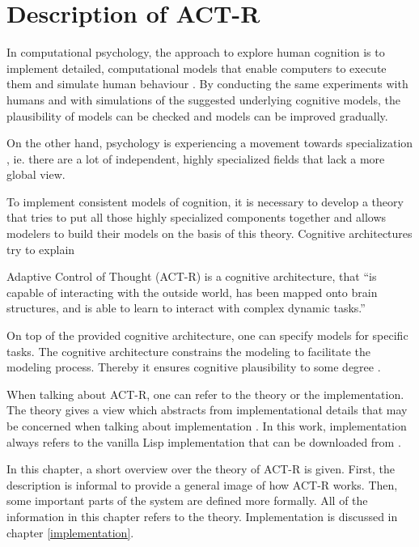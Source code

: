 \chapter{Description of ACT-R}

In computational psychology, the approach to explore human cognition is to implement detailed, computational models that enable computers to execute them and simulate human behaviour \cite{sun_introduction_2008}. By conducting the same experiments with humans and with simulations of the suggested underlying cognitive models, the plausibility of models can be checked and models can be improved gradually.

On the other hand, psychology is experiencing a movement towards specialization \cite{anderson_integrated_2004}, ie. there are a lot of independent, highly specialized fields that lack a more global view.

To implement consistent models of cognition, it is necessary to develop a theory that tries to put all those highly specialized components together and allows modelers to build their models on the basis of this theory. Cognitive architectures try to explain 


Adaptive Control of Thought (ACT-R) is a cognitive architecture, that ``is capable of interacting with the outside world, has been mapped onto brain structures, and is able to learn to interact with complex dynamic tasks.'' \cite[p. 29]{taatgen_modeling_2006} 

On top of the provided cognitive architecture, one can specify models for specific tasks. The cognitive architecture constrains the modeling to facilitate the modeling process. Thereby it ensures cognitive plausibility to some degree \cite[p. 29]{taatgen_modeling_2006}.

When talking about ACT-R, one can refer to the theory or the implementation. The theory gives a view which abstracts from implementational details that may be concerned when talking about implementation . In this work, implementation always refers to the vanilla Lisp implementation that can be downloaded from \cite{actr_homepage}.

In this chapter, a short overview over the theory of ACT-R is given. First, the description is informal to provide a general image of how ACT-R works. Then, some important parts of the system are defined more formally. All of the information in this chapter refers to the theory. Implementation is discussed in chapter \ref{implementation}.

